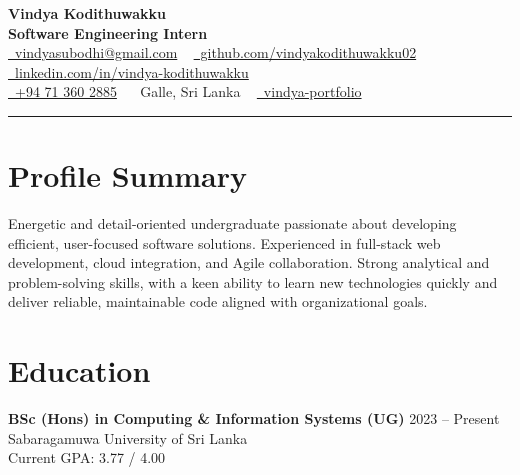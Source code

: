 \documentclass[letterpaper,11.8pt]{article}
\begin{document}
\justifying
\fontsize{11.2}{13}\selectfont

\begin{center}
{\Huge\color{accentTitle}\textbf{Vindya Kodithuwakku}}\\[3pt]
{\large\textbf{Software Engineering Intern}}\\[4pt]
\href{mailto:vindyasubodhi@gmail.com}{\faEnvelope~vindyasubodhi@gmail.com} ~
\href{https://github.com/vindyakodithuwakku02}{\faGithub~github.com/vindyakodithuwakku02} ~
\href{https://www.linkedin.com/in/vindya-kodithuwakku-bb6187202}{\faLinkedin~linkedin.com/in/vindya-kodithuwakku}\\[2pt]
\href{tel:+94713602885}{\faPhone~+94 71 360 2885} ~
\faMapMarker*~Galle, Sri Lanka ~
\href{https://vindyakodithuwakku02.github.io/vindya-portfolio/}{\faGlobe~vindya-portfolio}\\[4pt]
{\color{accentLine}\hrule}
\end{center}

\fontsize{12}{13}\selectfont

\vspace{-20pt}
\section{Profile Summary}
\vspace{-2pt}
\justifying
Energetic and detail-oriented undergraduate passionate about developing efficient, user-focused software solutions. Experienced in full-stack web development, cloud integration, and Agile collaboration. Strong analytical and problem-solving skills, with a keen ability to learn new technologies quickly and deliver reliable, maintainable code aligned with organizational goals.

\section{Education}
\vspace{-1pt}
\justifying  %

\textbf{BSc (Hons) in Computing \& Information Systems (UG)} \hfill 2023 – Present\\
Sabaragamuwa University of Sri Lanka\\
Current GPA: 3.77 / 4.00
\end{document}
